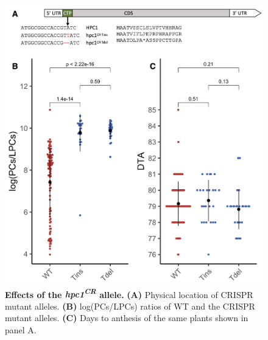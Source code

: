 \begin{figure}[t]
\begin{center}
\includegraphics[width=0.8\linewidth]{Sup_Figures/Sup_Fig_7.png}
\caption[Effects of the \textit{hpc1\textsuperscript{CR}} allele.]
{\textbf{Effects of the \textit{hpc1\textsuperscript{CR}} allele.}
\textbf{(A)} Physical location of \hpc CRISPR mutant alleles. \textbf{(B)} log(PCs/LPCs) ratios of WT and the \hpc CRISPR mutant alleles. \textbf{(C)} Days to anthesis of the same plants shown in panel A.   
}
\label{figure:Sup:CRISPR_effect}
\end{center}
\end{figure} 
\clearpage



